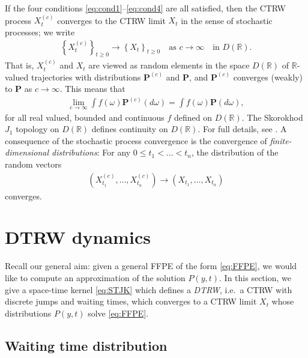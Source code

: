 \documentclass[a4paper,12pt]{elsarticle}
\numberwithin{equation}{section}
\theoremstyle{plain}
\theoremstyle{definition}
\theoremstyle{remark}
\numberwithin{equation}{section}
\newcommand{\spc}{\mathbb R}
\newcommand{\1}{\mathbf 1}
\newcommand{\pr}{\mathbf P}
\begin{document}
If the four conditions \eqref{eq:cond1}--\eqref{eq:cond4} are all satisfied, then the CTRW process $X^{(c)}_t$ converges to the CTRW limit $X_t$ in the sense of stochastic processes; we write 
\begin{align} \label{eq:CTRW-J1}
\left \lbrace X^{(c)}_t \right\rbrace_{t \ge 0} 
\longrightarrow \left \lbrace X_t \right\rbrace_{t \ge 0} 
\quad \text{as } c \to \infty
\quad \text{in } D(\spc).
\end{align}
That is, $X^{(c)}_t$ and $X_t$ are viewed as random elements in the space $D(\spc)$ of $\spc$-valued trajectories with distributions $\pr^{(c)}$ and $\pr$, and $\pr^{(c)}$ converges (weakly) to $\pr$ as $c \to \infty$.  
This means that
\begin{align}
\lim_{c \to \infty} \int f(\omega)\pr^{(c)}(d\omega)
= \int f(\omega)\pr(d\omega), 
\end{align}
for all real valued, bounded and continuous $f$ defined on $D(\spc)$. 
The Skorokhod $J_1$ topology on $D(\spc)$ defines continuity on $D(\spc)$. For full details, see \cite{Whitt2010}.  A consequence of the stochastic process convergence is the convergence of \emph{finite-dimensional distributions}: For any $0 \le t_1 < \ldots < t_n$, the distribution of the random vectors
\begin{align}
(X^{(c)}_{t_1}, \ldots, X^{(c)}_{t_n}) \to (X_{t_1}, \ldots, X_{t_n})
\end{align}
converges. 



\section{DTRW dynamics}

Recall our general aim: given a general FFPE of the form \eqref{eq:FFPE}, we would like to compute an approximation of the solution $P(y,t)$.  In this section, we give a space-time kernel \eqref{eq:STJK} which defines a \emph{DTRW}, i.e.\ a CTRW with discrete jumps and waiting times, which converges to a CTRW limit $X_t$ whose distributions $P(y,t)$ solve \eqref{eq:FFPE}.


\subsection{Waiting time distribution}
\end{document}
